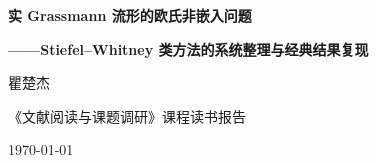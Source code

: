 \documentclass[11pt,a4paper,UTF8]{ctexart}
\numberwithin{equation}{section}
\theoremstyle{plain}
\theoremstyle{definition}
\theoremstyle{remark}
\begin{document}
\begin{titlepage}
  \centering
  \vspace*{2.2cm}
  {\LARGE\bfseries 实 Grassmann 流形的欧氏非嵌入问题\par}
  \vspace{0.7cm}
  {\large\bfseries ——Stiefel--Whitney 类方法的系统整理与经典结果复现\par}
  \vspace{2.2cm}
  {\large 瞿楚杰\par}
  \vspace{0.5cm}
  {\normalsize《文献阅读与课题调研》课程读书报告\par}
  \vfill
  {\normalsize \today\par}
\end{titlepage}


\tableofcontents
\clearpage
{}









\appendix
\clearpage



\end{document}
